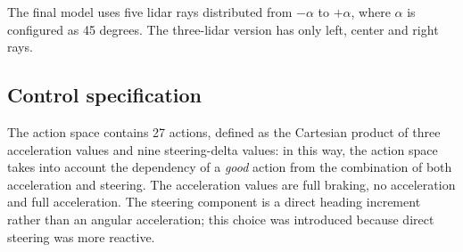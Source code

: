 The final model uses five lidar rays distributed from $-\alpha$ to $+\alpha$, where $\alpha$ is configured as 45 degrees. The three-lidar version has only left, center and right rays.

\subsection{Control specification}

The action space contains 27 actions, defined as the Cartesian product of three acceleration values and nine steering-delta values: in this way, the action space takes into account the dependency of a \textit{good} action from the combination of both acceleration and steering. The acceleration values are full braking, no acceleration and full acceleration. The steering component is a direct heading increment rather than an angular acceleration; this choice was introduced because direct steering was more reactive.
